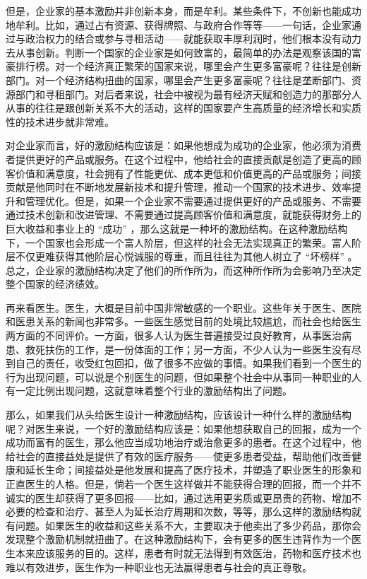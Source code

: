 但是，企业家的基本激励并非创新本身，而是牟利。某些条件下，不创新也能成功地牟利。比如，通过占有资源、获得牌照、与政府合作等等——一句话，企业家通过与政治权力的结合或参与寻租活动——就能获取丰厚利润时，他们根本没有动力去从事创新。判断一个国家的企业家是如何致富的，最简单的办法是观察该国的富豪排行榜。对一个经济真正繁荣的国家来说，哪里会产生更多富豪呢？往往是创新部门。对一个经济结构扭曲的国家，哪里会产生更多富豪呢？往往是垄断部门、资源部门和寻租部门。对后者来说，社会中被视为最有经济天赋和创造力的那部分人从事的往往是跟创新关系不大的活动，这样的国家要产生高质量的经济增长和实质性的技术进步就非常难。

对企业家而言，好的激励结构应该是：如果他想成为成功的企业家，他必须为消费者提供更好的产品或服务。在这个过程中，他给社会的直接贡献是创造了更高的顾客价值和满意度，社会拥有了性能更优、成本更低和价值更高的产品或服务；间接贡献是他同时在不断地发展新技术和提升管理，推动一个国家的技术进步、效率提升和管理优化。但是，如果一个企业家不需要通过提供更好的产品或服务、不需要通过技术创新和改进管理、不需要通过提高顾客价值和满意度，就能获得财务上的巨大收益和事业上的 “成功” ，那么这就是一种坏的激励结构。在这种激励结构下，一个国家也会形成一个富人阶层，但这样的社会无法实现真正的繁荣。富人阶层不仅更难获得其他阶层心悦诚服的尊重，而且往往为其他人树立了 “坏榜样” 。总之，企业家的激励结构决定了他们的所作所为，而这种所作所为会影响乃至决定整个国家的经济绩效。

再来看医生。医生，大概是目前中国非常敏感的一个职业。这些年关于医生、医院和医患关系的新闻也非常多。一些医生感觉目前的处境比较尴尬，而社会也给医生两方面的不同评价。一方面，很多人认为医生普遍接受过良好教育，从事医治病患、救死扶伤的工作，是一份体面的工作；另一方面，不少人认为一些医生没有尽到自己的责任，收受红包回扣，做了很多不应做的事情。如果我们看到一个医生的行为出现问题，可以说是个别医生的问题，但如果整个社会中从事同一种职业的人有一定比例出现问题，这就意味着整个行业的激励结构出了问题。

那么，如果我们从头给医生设计一种激励结构，应该设计一种什么样的激励结构呢？对医生来说，一个好的激励结构应该是：如果他想获取自己的回报，成为一个成功而富有的医生，那么他应当成功地治疗或治愈更多的患者。在这个过程中，他给社会的直接益处是提供了有效的医疗服务——使更多患者受益，帮助他们改善健康和延长生命；间接益处是他发展和提高了医疗技术，并塑造了职业医生的形象和正直医生的人格。但是，倘若一个医生这样做并不能获得合理的回报，而一个并不诚实的医生却获得了更多回报——比如，通过选用更劣质或更昂贵的药物、增加不必要的检查和治疗、甚至人为延长治疗周期和次数，等等，那么这样的激励结构就有问题。如果医生的收益和这些关系不大，主要取决于他卖出了多少药品，那你会发现整个激励机制就扭曲了。在这种激励结构下，会有更多的医生违背作为一个医生本来应该服务的目的。这样，患者有时就无法得到有效医治，药物和医疗技术也难以有效进步，医生作为一种职业也无法赢得患者与社会的真正尊敬。

